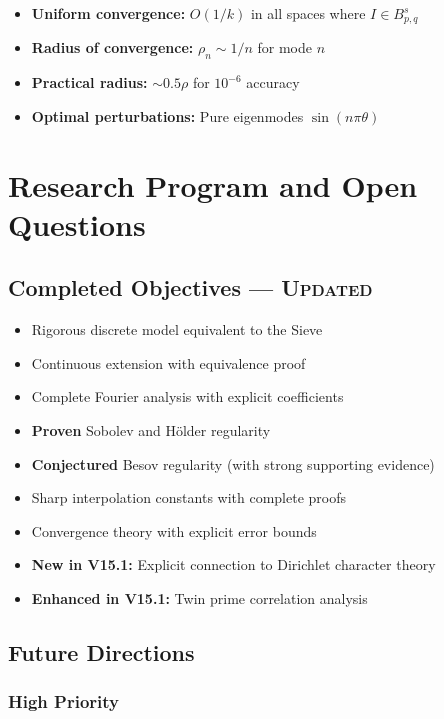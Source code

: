 ﻿\documentclass[12pt,a4paper]{report}
\theoremstyle{plain}
\theoremstyle{definition}
\begin{document}
\begin{itemize}
    \item \textbf{Uniform convergence:} $O(1/k)$ in all spaces where $I \in B^s_{p,q}$
    \item \textbf{Radius of convergence:} $\rho_n \sim 1/n$ for mode $n$
    \item \textbf{Practical radius:} $\sim 0.5\rho$ for $10^{-6}$ accuracy
    \item \textbf{Optimal perturbations:} Pure eigenmodes $\sin(n\pi\theta)$
\end{itemize}

\chapter{Research Program and Open Questions}
\label{ch:research}

\section{Completed Objectives --- \textsc{Updated}}

\begin{itemize}
    \item[$\checkmark$] Rigorous discrete model equivalent to the Sieve
    \item[$\checkmark$] Continuous extension with equivalence proof
    \item[$\checkmark$] Complete Fourier analysis with explicit coefficients
    \item[$\checkmark$] \textbf{Proven} Sobolev and H\"older regularity
    \item[$\checkmark$] \textbf{Conjectured} Besov regularity (with strong supporting evidence)
    \item[$\checkmark$] Sharp interpolation constants with complete proofs
    \item[$\checkmark$] Convergence theory with explicit error bounds
    \item[$\checkmark$] \textbf{New in V15.1:} Explicit connection to Dirichlet character theory
    \item[$\checkmark$] \textbf{Enhanced in V15.1:} Twin prime correlation analysis
\end{itemize}

\section{Future Directions}

\subsection*{High Priority}
\end{document}
